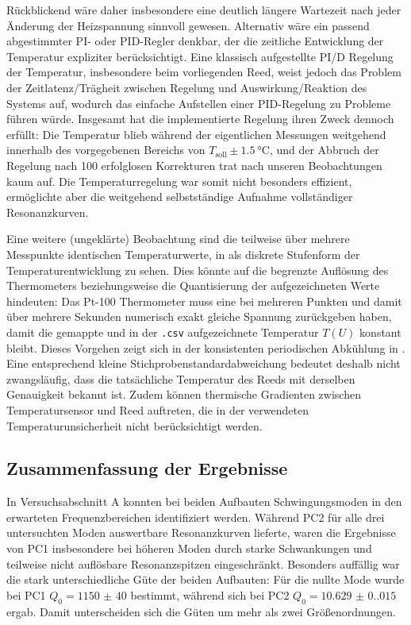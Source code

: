 \documentclass[11pt,a4paper]{article}
\begin{document}
Rückblickend wäre daher insbesondere eine deutlich längere Wartezeit nach jeder Änderung der Heizspannung sinnvoll gewesen. Alternativ wäre ein passend abgestimmter PI- oder PID-Regler denkbar, der die zeitliche Entwicklung der Temperatur expliziter berücksichtigt. Eine klassisch aufgestellte PI/D Regelung der Temperatur, insbesondere beim vorliegenden Reed, weist jedoch das Problem der Zeitlatenz/Trägheit zwischen Regelung und Auswirkung/Reaktion des Systems auf, wodurch das einfache Aufstellen einer PID-Regelung zu Probleme führen würde. Insgesamt hat die implementierte Regelung ihren Zweck dennoch erfüllt: Die Temperatur blieb während der eigentlichen Messungen weitgehend innerhalb des vorgegebenen Bereichs von $T_{\mathrm{soll}}\pm\qty{1.5}{\degreeCelsius}$, und der Abbruch der Regelung nach 100 erfolglosen Korrekturen trat nach unseren Beobachtungen kaum auf. Die Temperaturregelung war somit nicht besonders effizient, ermöglichte aber die weitgehend selbstständige Aufnahme vollständiger Resonanzkurven.

Eine weitere (ungeklärte) Beobachtung sind die teilweise über mehrere Messpunkte identischen Temperaturwerte, in  als diskrete Stufenform der Temperaturentwicklung zu sehen. Dies könnte auf die begrenzte Auflösung des Thermometers beziehungsweise die Quantisierung der aufgezeichneten Werte hindeuten: Das Pt-100 Thermometer muss eine bei mehreren Punkten und damit über mehrere Sekunden numerisch exakt gleiche Spannung zurückgeben haben, damit die gemappte und in der \verb|.csv| aufgezeichnete Temperatur \(T(U)\) konstant bleibt. Dieses Vorgehen zeigt sich in der konsistenten periodischen Abkühlung in . Eine entsprechend kleine Stichprobenstandardabweichung bedeutet deshalb nicht zwangsläufig, dass die tatsächliche Temperatur des Reeds mit derselben Genauigkeit bekannt ist. Zudem können thermische Gradienten zwischen Temperatursensor und Reed auftreten, die in der verwendeten Temperaturunsicherheit nicht berücksichtigt werden.



\subsection{Zusammenfassung der Ergebnisse}


In Versuchsabschnitt A konnten bei beiden Aufbauten Schwingungsmoden in den erwarteten Frequenzbereichen identifiziert werden. Während PC2 für alle drei untersuchten Moden auswertbare Resonanzkurven lieferte, waren die Ergebnisse von PC1 insbesondere bei höheren Moden durch starke Schwankungen und teilweise nicht auflösbare Resonanzspitzen eingeschränkt. Besonders auffällig war die stark unterschiedliche Güte der beiden Aufbauten: Für die nullte Mode wurde bei PC1 $Q_0=\num{1150(40)}$ bestimmt, während sich bei PC2 $Q_0=\num{10.629(0.015)}$ ergab. Damit unterscheiden sich die Güten um mehr als zwei Größenordnungen.
\end{document}
